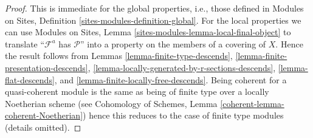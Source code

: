 \documentclass{stacks-project}
\theoremstyle{plain}
\theoremstyle{definition}
\theoremstyle{remark}
\numberwithin{equation}{subsection}
\begin{document}
\begin{proof}
This is immediate for the global properties, i.e., those defined in
Modules on Sites, Definition \ref{sites-modules-definition-global}.
For the local properties we can use
Modules on Sites, Lemma \ref{sites-modules-lemma-local-final-object}
to translate ``$\mathcal{F}^a$ has $\mathcal{P}$'' into a property
on the members of a covering of $X$. Hence the result follows from
Lemmas \ref{lemma-finite-type-descends},
\ref{lemma-finite-presentation-descends},
\ref{lemma-locally-generated-by-r-sections-descends},
\ref{lemma-flat-descends}, and
\ref{lemma-finite-locally-free-descends}.
Being coherent for a quasi-coherent module is the same as being
of finite type over a locally Noetherian scheme (see
Cohomology of Schemes, Lemma \ref{coherent-lemma-coherent-Noetherian})
hence this reduces
to the case of finite type modules (details omitted).
\end{proof}
\end{document}
